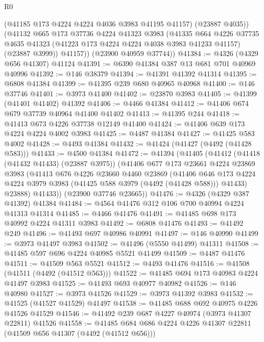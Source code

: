 \begin{lexlean}{R0}
\begin{coremodule}
          (@41185 @173 @4224 @4224 @4036 @3983 @41195 @41157)
          (@23887 @4035))
        (@41132
          @665
          @173
          @37736
          @4224
          @41323
          @3983
          (@41335
            @664
            @4226
            @37735
            @4635
            @41323
            (@41223 @173 @4224 @4224 @4038 @3983 @41233 @41157)
            (@23887 @3999))
          @41157))
      (@23900 @40959 @37744))
@41384 := @4326 (@4329 @656 @41307) @41124
@41391 := @6390 @41384 @387 @13 @681 @701 @40969 @40996
@41392 := @146 @38379
@41394 := @41391 @41392 @41314
@41395 := @6808 @41384
@41399 := @41395 @239 @680 @40965 @40968
@41400 := @146 @37746
@41401 := @3973 @41400
@41402 := @23870 @3983
@41405 := @41399 (@41401 @41402) @41392
@41406 := @4466 @41384
@41412 := @41406 @674 @679 @37739 @40964 @41400 @41402
@41413 := @41395 @244
@41418 := @41413 @673 @4226 @37738 @12149 @41400
@41424 := @41406 @639 @173 @4224 @4224 @4002 @3983
@41425 := @4487 @41384
@41427 := @41425 @583 @4002
@41428 := @4493 @41384
@41432 := @41424 (@41427 (@4492 (@41428 @583)))
@41433 := @4500 @41384
@41472 := @41394
    (@41405
      (@41412
        (@41418 (@41432 @41433) (@23887 @3975))
        (@41406
          @677
          @173
          @23661
          @4224
          @23869
          @3983
          (@41413
            @676
            @4226
            @23660
            @4460
            @23869
            (@41406
              @646
              @173
              @4224
              @4224
              @3979
              @3983
              (@41425 @588 @3979 (@4492 (@41428 @588)))
              @41433)
            @23888)
          @41433))
      (@23900 @37746 @23665))
@41476 := @4326 (@4329 @387 @41392) @41384
@41484 := @4564 @41476 @312 @106 @700 @40994 @4224 @41313 @41314
@41485 := @4466 @41476
@41491 := @41485 @698 @173 @40992 @4224 @41311 @3983
@41492 := @6808 @41476
@41493 := @41492 @249
@41496 := @41493 @697 @40986 @40991
@41497 := @146 @40990
@41499 := @3973 @41497 @3983
@41502 := @41496 (@5550 @41499) @41311
@41508 := @41485 @597 @696 @4224 @40985 @5521 @41499
@41509 := @4487 @41476
@41511 := @41509 @563 @5521
@41512 := @4493 @41476
@41516 := @41508 (@41511 (@4492 (@41512 @563)))
@41522 := @41485 @694 @173 @40983 @4224 @41497 @3983
@41525 := @41493 @693 @40977 @40982
@41526 := @146 @40980
@41527 := @3973 @41526
@41529 := @3973 @41392 @3983
@41532 := @41525 (@41527 @41529) @41497
@41538 := @41485 @688 @692 @40975 @4226 @41526 @41529
@41546 := @41492 @239 @687 @4227 @40974 (@3973 @41307 @22811) @41526
@41558 := @41485 @684 @686 @4224 @4226 @41307 @22811 (@41509 @656 @41307 (@4492 (@41512 @656)))

\end{coremodule}
\end{lexlean}
